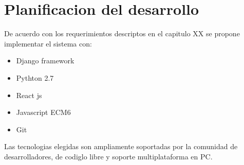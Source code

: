 \section{Planificacion del desarrollo}


De acuerdo con los requerimientos descriptos en el capitulo XX se propone implementar el sistema
con:

\begin{itemize}
    \item Django framework \item Pythton 2.7
    \item React js \item Javascript ECM6
    \item Git
\end{itemize}
Las tecnologias elegidas son ampliamente soportadas por la comunidad de desarrolladores, de codiglo libre y soporte multiplataforma en PC.

